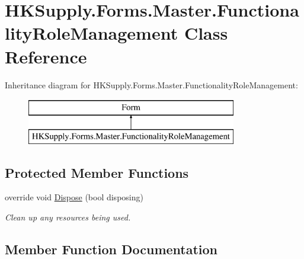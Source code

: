 \hypertarget{class_h_k_supply_1_1_forms_1_1_master_1_1_functionality_role_management}{}\section{H\+K\+Supply.\+Forms.\+Master.\+Functionality\+Role\+Management Class Reference}
\label{class_h_k_supply_1_1_forms_1_1_master_1_1_functionality_role_management}
Inheritance diagram for H\+K\+Supply.\+Forms.\+Master.\+Functionality\+Role\+Management\+:\begin{figure}[H]
\begin{center}
\leavevmode
\includegraphics[height=2.000000cm]{class_h_k_supply_1_1_forms_1_1_master_1_1_functionality_role_management}
\end{center}
\end{figure}
\subsection*{Protected Member Functions}
\begin{DoxyCompactItemize}
\item 
override void \hyperlink{class_h_k_supply_1_1_forms_1_1_master_1_1_functionality_role_management_a9a7c00e015e462fba8baf1e25be79413}{Dispose} (bool disposing)
\begin{DoxyCompactList}\small\item\em Clean up any resources being used. \end{DoxyCompactList}\end{DoxyCompactItemize}


\subsection{Member Function Documentation}
\mbox{\label{class_h_k_supply_1_1_forms_1_1_master_1_1_functionality_role_management_a9a7c00e015e462fba8baf1e25be79413}} 
